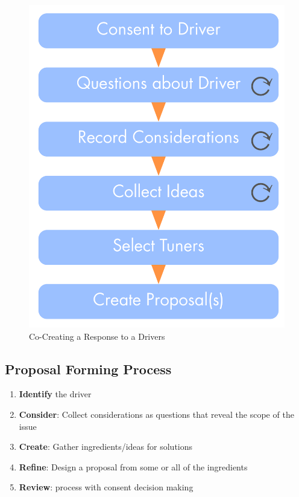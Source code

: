 \begin{figure}[htbp]
\centering
\includegraphics[keepaspectratio,width=\textwidth,height=0.75\textheight]{img/agreements/proposal-forming-medium.png}
\caption{Co-Creating a Response to a Drivers}
\end{figure}

\subsection{Proposal Forming Process}
\label{proposalformingprocess}

\begin{enumerate}
\item \textbf{Identify} the driver

\item \textbf{Consider}: Collect considerations as questions that reveal the scope of the issue

\item \textbf{Create}: Gather ingredients\slash ideas for solutions

\item \textbf{Refine}: Design a proposal from some or all of the ingredients

\item \textbf{Review}: process with consent decision making

\end{enumerate}

